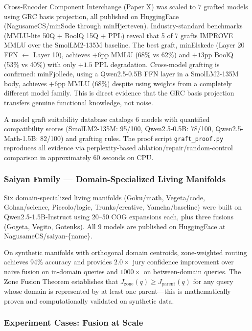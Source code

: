 \documentclass[11pt]{article}
\begin{document}
Cross-Encoder Component Interchange (Paper X) was scaled to 7 grafted models using GRC basis projection, all published on HuggingFace (NagusameCS/minSode through minHjerteven). Industry-standard benchmarks (MMLU-lite 50Q + BoolQ 15Q + PPL) reveal that 5 of 7 grafts IMPROVE MMLU over the SmolLM2-135M baseline. The best graft, minElskede (Layer 20 FFN $\leftarrow$ Layer 10), achieves $+6$pp MMLU (68\% vs 62\%) and $+13$pp BoolQ (53\% vs 40\%) with only $+1.5$ PPL degradation. Cross-model grafting is confirmed: minFjollede, using a Qwen2.5-0.5B FFN layer in a SmolLM2-135M body, achieves $+6$pp MMLU ($68\%$) despite using weights from a completely different model family. This is direct evidence that the GRC basis projection transfers genuine functional knowledge, not noise.

A model graft suitability database catalogs 6 models with quantified compatibility scores (SmolLM2-135M: 95/100, Qwen2.5-0.5B: 78/100, Qwen2.5-Math-1.5B: 82/100) and grafting rules. The proof script \texttt{graft\_proof.py} reproduces all evidence via perplexity-based ablation/repair/random-control comparison in approximately 60 seconds on CPU.

\subsubsection*{Saiyan Family --- Domain-Specialized Living Manifolds}

Six domain-specialized living manifolds (Goku/math, Vegeta/code, Gohan/science, Piccolo/logic, Trunks/creative, Yamcha/baseline) were built on Qwen2.5-1.5B-Instruct using 20--50 COG expansions each, plus three fusions (Gogeta, Vegito, Gotenks). All 9 models are published on HuggingFace at NagusameCS/saiyan-\{name\}.

On synthetic manifolds with orthogonal domain centroids, zone-weighted routing achieves 94\% accuracy and provides $2.0\times$ jury confidence improvement over naive fusion on in-domain queries and $1000\times$ on between-domain queries. The Zone Fusion Theorem establishes that $J_{\text{zone}}(q) \ge J_{\text{parent}}(q)$ for any query whose domain is represented by at least one parent---this is mathematically proven and computationally validated on synthetic data.

\subsubsection*{Experiment Cases: Fusion at Scale}
\end{document}
